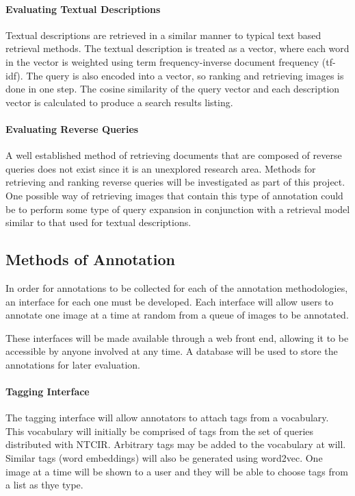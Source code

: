 \documentclass[12pt,a4paper]{article}
\begin{document}
\paragraph{Evaluating Textual Descriptions}
Textual descriptions are retrieved in a similar manner to typical text based retrieval methods. The textual description is treated as a vector, where each word in the vector is weighted using term frequency-inverse document frequency (tf-idf). The query is also encoded into a vector, so ranking and retrieving images is done in one step. The cosine similarity of the query vector and each description vector is calculated to produce a search results listing.

\paragraph{Evaluating Reverse Queries}
A well established method of retrieving documents that are composed of reverse queries does not exist since it is an unexplored research area. Methods for retrieving and ranking reverse queries will be investigated as part of this project. One possible way of retrieving images that contain this type of annotation could be to perform some type of query expansion in conjunction with a retrieval model similar to that used for textual descriptions.

\subsection{Methods of Annotation}
In order for annotations to be collected for each of the annotation methodologies, an interface for each one must be developed. Each interface will allow users to annotate one image at a time at random from a queue of images to be annotated. 

These interfaces will be made available through a web front end, allowing it to be accessible by anyone involved at any time. A database will be used to store the annotations for later evaluation.
\pagebreak
\paragraph{Tagging Interface}
The tagging interface will allow annotators to attach tags from a vocabulary. This vocabulary will initially be comprised of tags from the set of queries distributed with NTCIR. Arbitrary tags may be added to the vocabulary at will. Similar tags (word embeddings) will also be generated using word2vec. One image at a time will be shown to a user and they will be able to choose tags from a list as thye type.
\end{document}
